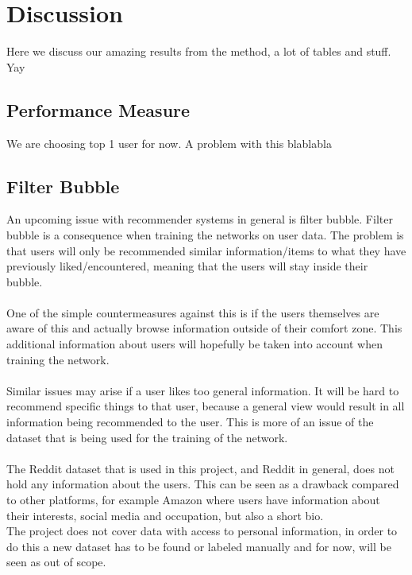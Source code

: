 \chapter{Discussion}

Here we discuss our amazing results from the method, a lot of tables and stuff. Yay


\section{Performance Measure}%
We are choosing top 1 user for now. A problem with this blablabla 


\section{Filter Bubble}
An upcoming issue with recommender systems in general is filter bubble.
Filter bubble is a consequence when training the networks on user data. The problem is that users will only be recommended similar information/items to what they have previously liked/encountered, meaning that the users will stay inside their bubble. 
\\\\
One of the simple countermeasures against this is if the users themselves are aware of this and actually browse information outside of their comfort zone. This additional information about users will hopefully be taken into account when training the network. 
\\\\
Similar issues may arise if a user likes too general information. It will be hard to recommend specific things to that user, because a general view would result in all information being recommended to the user. This is more of an issue of the dataset that is being used for the training of the network. 
\\\\
The Reddit dataset that is used in this project, and Reddit in general, does not hold any information about the users. This can be seen as a drawback compared to other platforms, for example Amazon where users have information about their interests, social media and occupation, but also a short bio. \\
The project does not cover data with access to personal information, in order to do this a new dataset has to be found or labeled manually and for now, will be seen as out of scope.